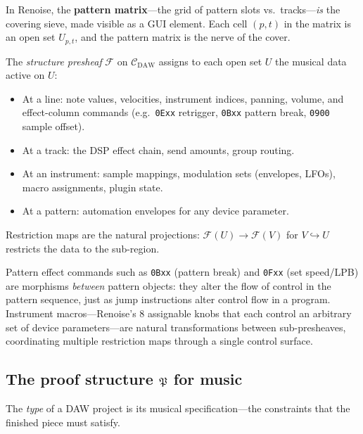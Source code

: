 In Renoise, the \textbf{pattern matrix}---the grid of pattern
slots vs.\ tracks---\emph{is} the covering sieve, made visible as
a GUI element.  Each cell $(p, t)$ in the matrix is an open set
$U_{p,t}$, and the pattern matrix is the nerve of the cover.

\begin{definition}
\label{def:musical-presheaf}
The \emph{structure presheaf} $\mathcal{F}$ on
$\mathcal{C}_{\mathrm{DAW}}$ assigns to each open set $U$ the
musical data active on $U$:
\begin{itemize}
  \item At a line: note values, velocities, instrument indices,
        panning, volume, and effect-column commands
        (e.g.\ \texttt{0Exx} retrigger, \texttt{0Bxx} pattern
        break, \texttt{0900} sample offset).
  \item At a track: the DSP effect chain, send amounts, group
        routing.
  \item At an instrument: sample mappings, modulation sets
        (envelopes, LFOs), macro assignments, plugin state.
  \item At a pattern: automation envelopes for any device
        parameter.
\end{itemize}
Restriction maps are the natural projections:
$\mathcal{F}(U) \to \mathcal{F}(V)$ for $V \hookrightarrow U$
restricts the data to the sub-region.
\end{definition}

\begin{remark}
Pattern effect commands such as \texttt{0Bxx} (pattern break) and
\texttt{0Fxx} (set speed/LPB) are morphisms \emph{between} pattern
objects: they alter the flow of control in the pattern sequence,
just as jump instructions alter control flow in a program.
Instrument macros---Renoise's 8 assignable knobs that each control
an arbitrary set of device parameters---are natural transformations
between sub-presheaves, coordinating multiple restriction maps
through a single control surface.
\end{remark}

\subsection{The proof structure \texorpdfstring{$\mathfrak{P}$}{P} for
  music}
\label{ssec:musical-proof}

The \emph{type} of a DAW project is its musical specification---the
constraints that the finished piece must satisfy.

